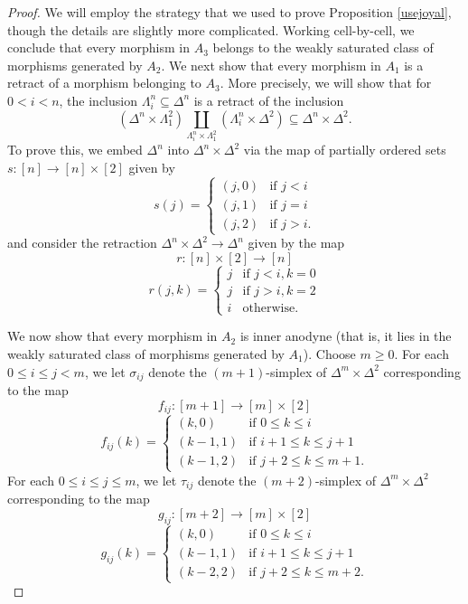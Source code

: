 \begin{proof}
We will employ the strategy that we used to prove Proposition \ref{usejoyal}, though the details are slightly more complicated. Working cell-by-cell, we conclude that every morphism in $A_3$ belongs to the weakly saturated class of morphisms generated by $A_2$. We next show that every morphism in $A_1$ is a retract of a morphism belonging to $A_3$. More precisely, we will show that for
$0 < i < n$, the inclusion $\Lambda^n_i \subseteq \Delta^n$ is a retract of the inclusion
$$ (\Delta^n \times \Lambda^2_1) \coprod_{ \Lambda^n_i \times \Lambda^2_1 }
( \Lambda^n_i \times \Delta^2) \subseteq \Delta^n \times \Delta^2.$$
To prove this, we embed $\Delta^n$ into $\Delta^n \times \Delta^2$ via
the map of partially ordered sets
$ s: [n] \rightarrow [n] \times [2]$ given by
$$ s(j) = \begin{cases} (j,0) & \text{if } j < i \\
(j,1) & \text{if } j = i \\
(j,2) & \text{if } j > i. \end{cases}$$
and consider the retraction $\Delta^n \times \Delta^2 \rightarrow \Delta^n$ given
by the map
$$ r: [n] \times [2] \rightarrow [n]$$
$$ r(j,k) = \begin{cases} j & \text{if } j < i, k=0 \\
j & \text{if } j > i, k = 2 \\
i & \text{otherwise.} \end{cases}$$

We now show that every morphism in $A_2$ is inner anodyne (that is, it lies in the weakly saturated class of morphisms generated by $A_1$). Choose $m \geq 0$. For each $0 \leq i \leq j < m$, we let
$\sigma_{ij}$ denote the $(m+1)$-simplex of $\Delta^m \times \Delta^2$ corresponding to the map
$$ f_{ij}: [m+1] \rightarrow [m] \times [2]$$
$$f_{ij}(k) = \begin{cases} (k,0) & \text{if } 0 \leq k \leq i \\
(k-1, 1) & \text{if } i+1 \leq k \leq j+1 \\
(k-1, 2) & \text{if } j+2 \leq k \leq m+1. \end{cases}$$
For each $0 \leq i \leq j \leq m$, we let $\tau_{ij}$ denote the $(m+2)$-simplex of $\Delta^m \times \Delta^2$ corresponding to the map
$$ g_{ij}: [m+2] \rightarrow [m] \times [2] $$
$$g_{ij}(k) = \begin{cases} (k,0) & \text{if } 0 \leq k \leq i \\
(k-1, 1) & \text{if } i+1 \leq k \leq j+1 \\
(k-2, 2) & \text{if } j+2 \leq k \leq m+2. \end{cases}$$


\end{proof}
